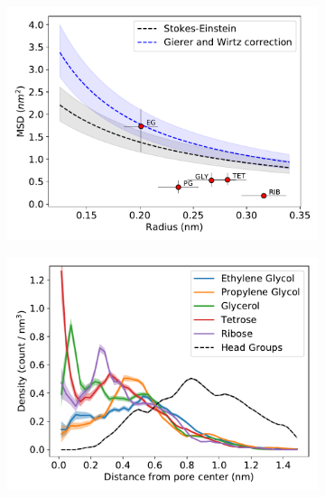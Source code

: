 \documentclass{article}
\begin{document}
  \begin{figure}[!htb]
  \centering
  \begin{subfigure}{0.325\textwidth}
  \includegraphics[width=\linewidth]{msd_radius_diols_10wt.pdf}
  \caption{}\label{fig:polyols_rdf}
  \end{subfigure}
  \begin{subfigure}{0.325\textwidth}
  \includegraphics[width=\linewidth]{polyols_rdf.pdf}
  \caption{}\label{fig:polyols_rdf}
  \end{subfigure}
  \begin{subfigure}{0.325\textwidth}
  \vspace{-0.275cm}

\end{subfigure}
\end{figure}
\end{document}
